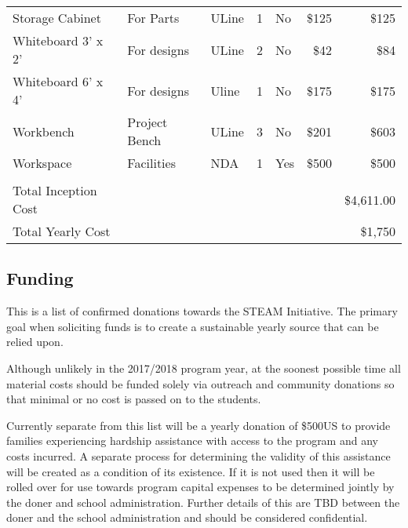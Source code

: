 \documentclass{article}
\begin{document}
\begin{table}[bh]
\begin{tabular}{ lp{3cm}lllrr }
Storage Cabinet& For Parts  & ULine  & 1  & No & \$125   & \$125    \\
Whiteboard 3’ x 2’&  For designs &   ULine &  2  & No&  \$42& \$84\\ 
Whiteboard 6’ x 4’ & For designs  &  Uline  & 1 &  No & \$175 &   \$175   \\ 
Workbench &  Project Bench & ULine &  3 &  No&  \$201  &  \$603   \\ 
Workspace  & Facilities  &NDA &1  & Yes& \$500  &  \$500   \\ 
\hline
& & & \\
Total Inception Cost     &    & & & & &            \$4,611.00   \\
Total Yearly Cost         &   & & & & &       \$1,750  \\
\hline
\end{tabular}
\end{table}

\newpage

\subsection*{Funding}

This is a list of confirmed donations towards the STEAM Initiative. The primary goal when soliciting funds is to create a sustainable yearly source that can be relied upon. 

Although unlikely in the 2017/2018 program year, at the soonest possible time all material costs should be funded solely via outreach and community donations so that minimal or no cost is passed on to the students. 

Currently separate from this list will be a yearly donation of \$500US to provide families experiencing hardship assistance with access to the program and any costs incurred. A separate process for determining the validity of this assistance will be created as a condition of its existence. If it is not used then it will be rolled over for use towards program capital expenses to be determined jointly by the doner and school administration.  Further details of this are TBD between the doner and the school administration and should be considered confidential.
\end{document}
